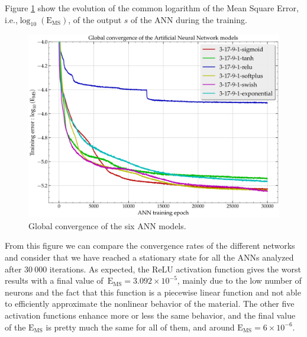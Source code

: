 \documentclass[algorithms,article,submit,pdftex,oneauthors]{Definitions/mdpi}
\makeatletter
\DeclareRobustCommand{\ie}{i.e.,\@\xspace}
\DeclareRobustCommand{\MSE}{\text{E}_\text{MS}}
\makeatother
\begin{document}
Figure \ref{fig:ANN-conv} show the evolution of the common logarithm of the Mean Square Error, \ie $\log_{10}(\MSE)$, of the output $s$ of the ANN during the training.
\begin{figure}[h]
\centering
\includegraphics[width=0.8\columnwidth]{Figures/3Cr2Mo-convergence-17-9}
\caption{Global convergence of the six ANN models.}
\label{fig:ANN-conv}
\end{figure}
From this figure we can compare the convergence rates of the different networks and consider that we have reached a stationary state for all the ANNs analyzed after $30~000$ iterations.
As expected, the ReLU activation function gives the worst results with a final value of~$\MSE=3.092\times10^{-5}$, mainly due to the low number of neurons and the fact that this function is a piecewise linear function and not able to efficiently approximate the nonlinear behavior of the material.
The other five activation functions enhance more or less the same behavior, and the final value of the $\MSE$ is pretty much the same for all of them, and around $\MSE=6\times10^{-6}$.
\end{document}
